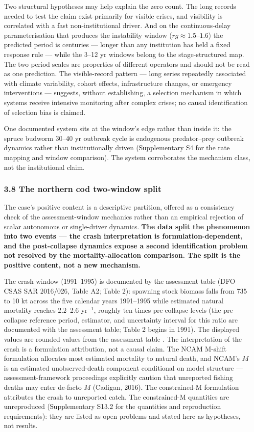 \documentclass[11pt]{article}
\begin{document}
Two structural hypotheses may help explain the zero count. The long
records needed to test the claim exist primarily for visible crises, and
visibility is correlated with a fast non-institutional driver. And on
the continuous-delay parameterisation that produces the instability
window (\(rg \approx 1.5\)--\(1.6\)) the predicted period is centuries
--- longer than any institution has held a fixed response rule --- while
the 3--12 yr windows belong to the stage-structured map. The two period
scales are properties of different operators and should not be read as
one prediction. The visible-record pattern --- long series repeatedly associated
with climate variability, cohort effects, infrastructure changes, or
emergency interventions --- suggests, without establishing, a selection
mechanism in which systems receive intensive monitoring after complex
crises; no causal identification of selection bias is claimed.

One documented system sits at the window's edge rather than inside it: the spruce budworm 30--40 yr outbreak cycle is endogenous predator--prey outbreak dynamics rather than institutionally driven (Supplementary S4 for the rate mapping and window comparison). The system corroborates the mechanism class, not the institutional claim.

\subsubsection{3.8 The northern cod two-window
split}\label{the-northern-cod-two-window-split}

The case's positive content is a descriptive partition, offered as a consistency check of the assessment-window mechanics rather than an empirical rejection of scalar autonomous or single-driver dynamics. \textbf{The
data split the phenomenon into two events --- the crash
interpretation is formulation-dependent, and the post-collapse dynamics
expose a second identification problem not resolved by the
mortality-allocation comparison. The split is the positive content, not
a new mechanism.}

The crash window (1991--1995) is documented by the assessment table (DFO
CSAS SAR 2016/026, Table A2; Table 2): spawning stock biomass falls from
735 to 10 kt across the five calendar years 1991--1995 while estimated
natural mortality reaches 2.2--2.6 yr\(^{-1}\), roughly ten times
pre-collapse levels (the pre-collapse reference period, estimator, and
uncertainty interval for this ratio are documented with the assessment
table; Table 2 begins in 1991). The displayed values are
rounded values from the assessment table . The
interpretation of the crash is a formulation attribution, not a causal
claim. The NCAM M-shift formulation allocates most estimated mortality
to natural death, and NCAM's \(M\) is an estimated unobserved-death
component conditional on model structure --- assessment-framework
proceedings explicitly caution that unreported fishing deaths may enter
de-facto \(M\) (Cadigan, 2016). The constrained-M formulation attributes
the crash to unreported catch. The constrained-M quantities are unreproduced (Supplementary S13.2 for the quantities and reproduction requirements): they are listed as open problems and stated here as hypotheses, not results.
\end{document}
